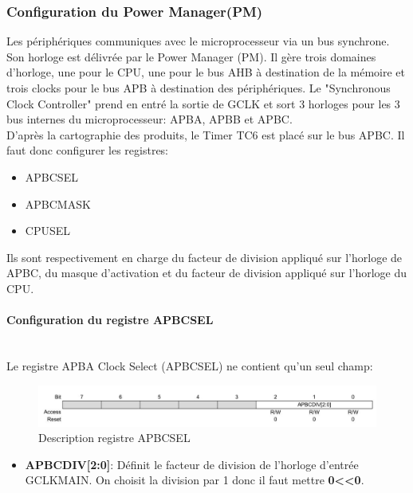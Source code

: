 \documentclass[a4paper]{article}
\begin{document}
	\subsubsection{Configuration du Power Manager(PM)} 
	Les périphériques communiques avec le microprocesseur via un bus synchrone. Son horloge est délivrée par le Power Manager (PM).
	Il gère trois domaines d'horloge, une pour le CPU, une pour le bus AHB à destination de la mémoire et trois clocks pour le bus APB à destination des périphériques.
	Le "Synchronous Clock Controller" prend en entré la sortie de GCLK et sort 3 horloges pour les 3 bus internes du microprocesseur: APBA, APBB et APBC.\\
	D'après la cartographie des produits, le Timer TC6 est placé sur le bus APBC. Il faut donc configurer les registres:
	\begin{itemize}
		\item {APBCSEL}
		\item {APBCMASK}
		\item {CPUSEL}
	\end{itemize}
Ils sont respectivement en charge du facteur de division appliqué sur l'horloge de APBC, du masque d'activation et du facteur de division appliqué sur l'horloge du CPU.
	\paragraph{Configuration du registre APBCSEL} 
	~~\\
	Le registre APBA Clock Select (APBCSEL) ne contient qu'un seul champ:\\
	\begin{figure}[H]
		\centering
		\includegraphics[width=0.9\linewidth]{APBCSEL.jpg}
		\caption{Description registre APBCSEL}
	\end{figure}
	
	\begin{itemize}
		\item {\bf APBCDIV[2:0]}: Définit le facteur de division de l'horloge d'entrée GCLKMAIN. On choisit la division par 1 donc il faut mettre {\bf 0\textless\textless0}.~~\\
	\end{itemize}
	
\end{document}
